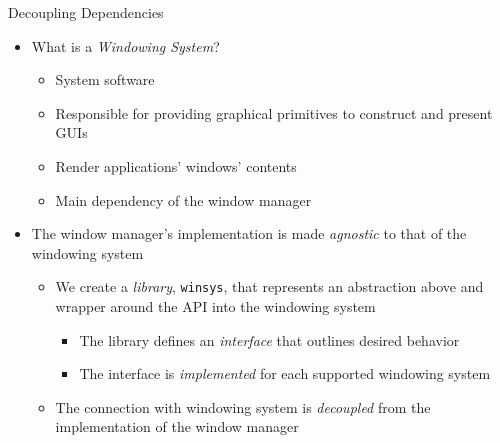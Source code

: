 \begin{csecframe}{Decoupling Dependencies}

    \begin{itemize}

        \item What is a \textit{Windowing System}?\\
            \begin{itemize}
                \item System software
                \item Responsible for providing graphical primitives to construct and present GUIs
                \item Render applications' windows' contents
                \item Main dependency of the window manager
            \end{itemize}

        \item The window manager's implementation is made \textit{agnostic} to that of the windowing system\\
            \begin{itemize}
                \item We create a \textit{library}, \texttt{winsys}, that represents an abstraction above and wrapper around the API into the windowing system
                \begin{itemize}
                    \item The library defines an \textit{interface} that outlines desired behavior
                    \item The interface is \textit{implemented} for each supported windowing system
                \end{itemize}
                \item The connection with windowing system is \textit{decoupled} from the implementation of the window manager
            \end{itemize}

    \end{itemize}

    \vfill

\end{csecframe}

